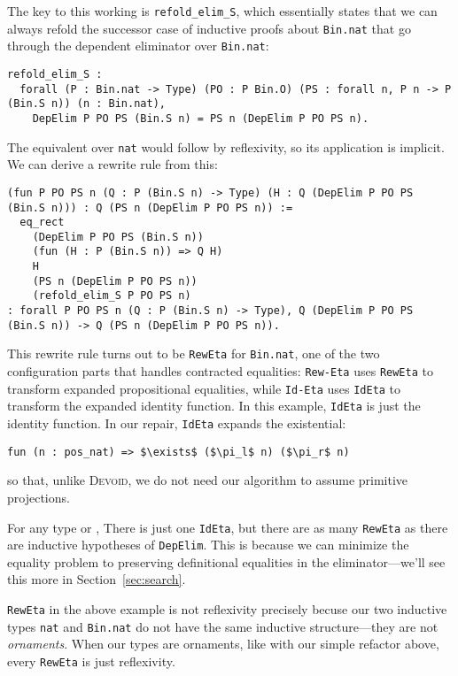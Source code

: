 The key to this working is \lstinline{refold_elim_S}, which essentially states that
we can always refold the successor case of inductive proofs about \lstinline{Bin.nat}
that go through the dependent eliminator over \lstinline{Bin.nat}:

\begin{lstlisting}
refold_elim_S :
  forall (P : Bin.nat -> Type) (PO : P Bin.O) (PS : forall n, P n -> P (Bin.S n)) (n : Bin.nat),
    DepElim P PO PS (Bin.S n) = PS n (DepElim P PO PS n).
\end{lstlisting}
The equivalent over \lstinline{nat} would follow by reflexivity, so its application is implicit.
We can derive a rewrite rule from this:

\begin{lstlisting}
(fun P PO PS n (Q : P (Bin.S n) -> Type) (H : Q (DepElim P PO PS (Bin.S n))) : Q (PS n (DepElim P PO PS n)) :=
  eq_rect
    (DepElim P PO PS (Bin.S n))
    (fun (H : P (Bin.S n)) => Q H)
    H
    (PS n (DepElim P PO PS n))
    (refold_elim_S P PO PS n)
: forall P PO PS n (Q : P (Bin.S n) -> Type), Q (DepElim P PO PS (Bin.S n)) -> Q (PS n (DepElim P PO PS n)).
\end{lstlisting}
This rewrite rule turns out to be \lstinline{RewEta} for \lstinline{Bin.nat}, one of the two configuration parts that 
handles contracted equalities:
\lstinline{Rew-Eta} uses \lstinline{RewEta} to transform expanded propositional equalities, while
\lstinline{Id-Eta} uses \lstinline{IdEta} to transform the expanded identity function.
In this example, \lstinline{IdEta} is just the identity function.
In our repair, \lstinline{IdEta} expands the existential:

\begin{lstlisting}
fun (n : pos_nat) => $\exists$ ($\pi_l$ n) ($\pi_r$ n)
\end{lstlisting}
so that, unlike \textsc{Devoid}, we do not need our algorithm to assume primitive projections.

For any type \A or \B,
There is just one \lstinline{IdEta}, but there are as many \lstinline{RewEta} as there are
inductive hypotheses of \lstinline{DepElim}.
This is because we can minimize the equality problem to preserving definitional equalities
in the eliminator---we'll see this more in Section~\ref{sec:search}.

\lstinline{RewEta} in the above example is not reflexivity precisely becuse our two inductive types
\lstinline{nat} and \lstinline{Bin.nat} do not have the same inductive structure---they are not \textit{ornaments}. %
When our types are ornaments, like with our simple refactor above, every \lstinline{RewEta} is just reflexivity.

